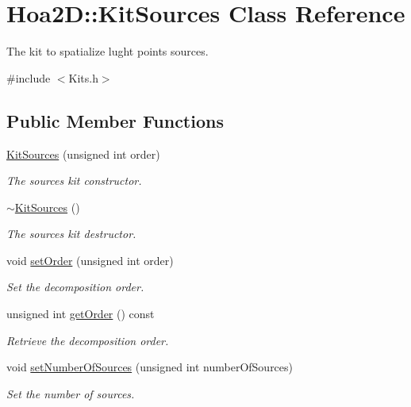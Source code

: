 \hypertarget{class_hoa2_d_1_1_kit_sources}{\section{Hoa2\-D\-:\-:Kit\-Sources Class Reference}
\label{class_hoa2_d_1_1_kit_sources}
}


The kit to spatialize lught points sources.  




{\ttfamily \#include $<$Kits.\-h$>$}

\subsection*{Public Member Functions}
\begin{DoxyCompactItemize}
\item 
\hyperlink{class_hoa2_d_1_1_kit_sources_a951cb97a492162ebd1f6abe3a8c4e3c6}{Kit\-Sources} (unsigned int order)
\begin{DoxyCompactList}\small\item\em The sources kit constructor. \end{DoxyCompactList}\item 
\hyperlink{class_hoa2_d_1_1_kit_sources_a2315dc84a9dbb1a99c321f40d14a4a75}{$\sim$\-Kit\-Sources} ()
\begin{DoxyCompactList}\small\item\em The sources kit destructor. \end{DoxyCompactList}\item 
void \hyperlink{class_hoa2_d_1_1_kit_sources_a8db835389bcd01ceb7cadc2f5f255c81}{set\-Order} (unsigned int order)
\begin{DoxyCompactList}\small\item\em Set the decomposition order. \end{DoxyCompactList}\item 
unsigned int \hyperlink{class_hoa2_d_1_1_kit_sources_a2a007d2395c80e5b6b7b7cce0fec25ec}{get\-Order} () const 
\begin{DoxyCompactList}\small\item\em Retrieve the decomposition order. \end{DoxyCompactList}\item 
void \hyperlink{class_hoa2_d_1_1_kit_sources_a9fdc6a4e0c685a2545434932443a8c05}{set\-Number\-Of\-Sources} (unsigned int number\-Of\-Sources)
\begin{DoxyCompactList}\small\item\em Set the number of sources. \end{DoxyCompactList}\item 

\end{DoxyCompactItemize}

